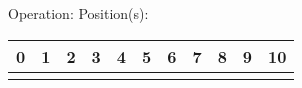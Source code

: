 \documentclass[12pt]{article}
\begin{document}
{{\begin{center}
            \end{center}
            Operation: \underline{\hspace{3cm}} \hspace{10px} Position(s): \underline{\hspace{2cm}}
            \begin{center}
                \begin{tabular}{|P{0.75cm}|P{0.75cm}|P{0.75cm}|P{0.75cm}|P{0.75cm}|P{0.75cm}|P{0.75cm}|P{0.75cm}|P{0.75cm}|P{0.75cm}|P{0.75cm}|}
                     & 1 & 2 & 3 & 4 & 5 & 6 & 7 & 8 & 9 & 10  \\
                    \hline
                    &&&&&&&&&& \\
                    \hline
                \end{tabular}
            \end{center}
        }
    }
\end{document}
